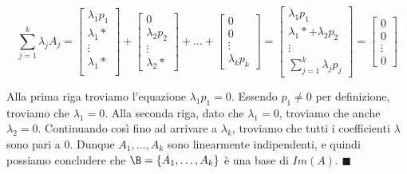 \documentclass[11pt, a4paper, titlepage, oneside]{scrbook}
\begin{document}
\[
\sum_{j = 1}^k \lambda_j A_j = 
\begin{bmatrix}
    \lambda_1 p_1 \\
    \lambda_1 * \\
    \vdots \\
    \lambda_1 * \\
\end{bmatrix}
+ \begin{bmatrix}
    0 \\
    \lambda_2 p_2 \\
    \vdots \\
    \lambda_2 *
\end{bmatrix}
+ \dots + 
\begin{bmatrix}
    0 \\
    0 \\
    \vdots \\
    \lambda_k p_k
\end{bmatrix}
= 
\begin{bmatrix}
    \lambda_1 p_1 \\
    \lambda_1 * + \lambda_2 p_2 \\
    \vdots \\
    \sum_{j = 1}^k \lambda_j p_j
\end{bmatrix}
=
\begin{bmatrix}
0  \\
0 \\
\vdots \\
0 
\end{bmatrix}
\] 

Alla prima riga troviamo l'equazione $\lambda_1 p_1 = 0$. Essendo $p_1 \neq 0$ per definizione, troviamo che $\lambda_1 = 0$. Alla seconda riga, dato che $\lambda_1 = 0$, troviamo che anche $\lambda_2 = 0$. Continuando così fino ad arrivare a $\lambda_k$, troviamo che tutti i coefficienti $\lambda$ sono pari a $0$. Dunque $A_1, \ldots, A_k$ sono linearmente indipendenti, e quindi possiamo concludere che $\B = \{A_1, \ldots, A_k\}$ è una base di $Im(A)$. $\blacksquare$ 
\end{document}
